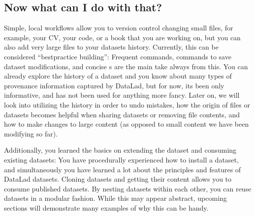 \subsection{Now what can I do with that?}
\label{\detokenize{basics/101-107-summary:now-what-can-i-do-with-that}}
\sphinxAtStartPar
Simple, local workflows allow you to version control changing small files,
for example, your CV, your code, or a book that you are working on, but
you can also add very large files to your datasets history.
Currently, this can be considered “best\sphinxhyphen{}practice building”: Frequent 
commands,  commands to save dataset modifications,
and concise {\hyperref[\detokenize{glossary:term-commit-message}]{}}s are the main take always from this. You can already explore
the history of a dataset and you know about many types of provenance information
captured by DataLad, but for now, its been only informative, and has not been used
for anything more fancy. Later on, we will look into utilizing the history
in order to undo mistakes, how the origin of files or datasets becomes helpful
when sharing datasets or removing file contents, and how to make changes to large
content (as opposed to small content we have been modifying so far).

\sphinxAtStartPar
Additionally, you learned the basics on extending the  dataset and consuming
existing datasets:
You have procedurally experienced how to install a dataset, and simultaneously you have
learned a lot about the principles and features of DataLad datasets.
Cloning datasets and getting their content allows you to consume published datasets.
By nesting datasets within each other, you can reuse datasets in a modular fashion. While this may
appear abstract, upcoming sections will demonstrate many examples of why this can be handy.

\sphinxstepscope


